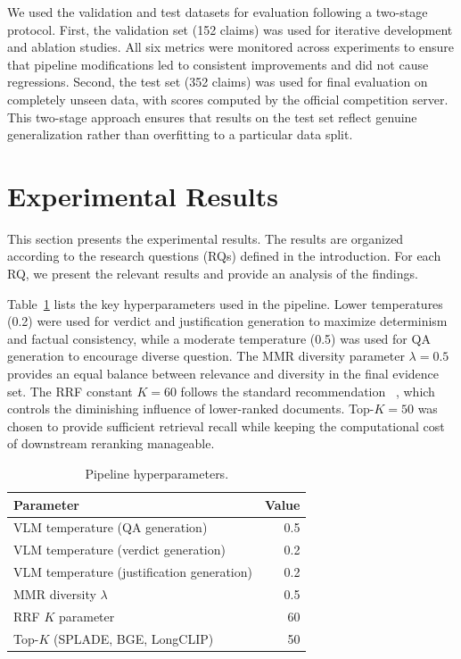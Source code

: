 We used the validation and test datasets for evaluation following a two-stage protocol. First, the validation set (152 claims) was used for iterative development and ablation studies. All six metrics were monitored across experiments to ensure that pipeline modifications led to consistent improvements and did not cause regressions. Second, the test set (352 claims) was used for final evaluation on completely unseen data, with scores computed by the official competition server. This two-stage approach ensures that results on the test set reflect genuine generalization rather than overfitting to a particular data split.

\section{Experimental Results}
This section presents the experimental results. The results are organized according to the research questions (RQs) defined in the introduction. For each RQ, we present the relevant results and provide an analysis of the findings.

Table~\ref{tab:hyperparams} lists the key hyperparameters used in the pipeline. Lower temperatures (0.2) were used for verdict and justification generation to maximize determinism and factual consistency, while a moderate temperature (0.5) was used for QA generation to encourage diverse question. The MMR diversity parameter $\lambda = 0.5$ provides an equal balance between relevance and diversity in the final evidence set. The RRF constant $K = 60$ follows the standard recommendation ~\cite{Cormack2009Jul}, which controls the diminishing influence of lower-ranked documents. Top-$K = 50$ was chosen to provide sufficient retrieval recall while keeping the computational cost of downstream reranking manageable.

\begin{table}[ht]
\centering
\caption{Pipeline hyperparameters.}
\label{tab:hyperparams}
\begin{tabular}{lr}
\hline
\textbf{Parameter} & \textbf{Value} \\
\hline

VLM temperature (QA generation)             & 0.5 \\
VLM temperature (verdict generation)        & 0.2 \\
VLM temperature (justification generation)  & 0.2 \\
MMR diversity $\lambda$                      & 0.5 \\
RRF $K$ parameter                            & 60  \\
Top-$K$ (SPLADE, BGE, LongCLIP)             & 50  \\
\hline
\end{tabular}
\end{table}

